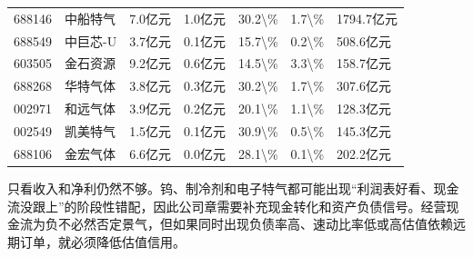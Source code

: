 \begin{exhibitbox}[2026年一季报财务交付和当前市值锚]
{\begin{tabular}{lllllll}
688146 & 中船特气 & 7.0亿元 & 1.0亿元 & 30.2\textbackslash{}\% & 1.7\textbackslash{}\% & 1794.7亿元 \\
688549 & 中巨芯-U & 3.7亿元 & 0.1亿元 & 15.7\textbackslash{}\% & 0.2\textbackslash{}\% & 508.6亿元 \\
603505 & 金石资源 & 9.2亿元 & 0.6亿元 & 14.5\textbackslash{}\% & 3.3\textbackslash{}\% & 158.7亿元 \\
688268 & 华特气体 & 3.8亿元 & 0.3亿元 & 30.2\textbackslash{}\% & 1.7\textbackslash{}\% & 307.6亿元 \\
002971 & 和远气体 & 3.9亿元 & 0.2亿元 & 20.1\textbackslash{}\% & 1.1\textbackslash{}\% & 128.3亿元 \\
002549 & 凯美特气 & 1.5亿元 & 0.1亿元 & 30.9\textbackslash{}\% & 0.5\textbackslash{}\% & 145.3亿元 \\
688106 & 金宏气体 & 6.6亿元 & 0.0亿元 & 28.1\textbackslash{}\% & 0.1\textbackslash{}\% & 202.2亿元 \\
\bottomrule
\end{tabular}
}
\end{exhibitbox}

只看收入和净利仍然不够。钨、制冷剂和电子特气都可能出现“利润表好看、现金流没跟上”的阶段性错配，因此公司章需要补充现金转化和资产负债信号。经营现金流为负不必然否定景气，但如果同时出现负债率高、速动比率低或高估值依赖远期订单，就必须降低估值信用。

